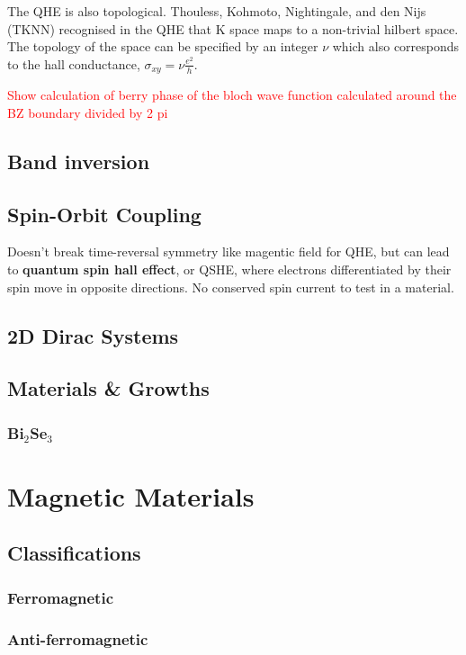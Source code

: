 \documentclass{article} %
\newcommand{\bismuthselinide}[1]{Bi$_2$Se$_3$#1}
\begin{document}
The QHE is also topological. Thouless, Kohmoto, Nightingale, and den Nijs (TKNN) recognised in the QHE that K space maps to a non-trivial hilbert space. The topology of the space can be specified by an integer $\nu$ which also corresponds to the hall conductance, $\sigma_{xy}=\nu \frac{e^2}{h}$. 

\textcolor{red}{Show calculation of berry phase of the bloch wave function calculated around the BZ boundary divided by 2 pi} %




\subsection{Band inversion}
\subsection{Spin-Orbit Coupling}
Doesn't break time-reversal symmetry like magentic field for QHE, but can lead to \textbf{quantum spin hall effect}, or QSHE, where electrons differentiated by their spin move in opposite directions. No conserved spin current to test in a material.

\subsection{2D Dirac Systems}

\subsection{Materials \& Growths}
\subsubsection{\bismuthselinide{}}

\section{Magnetic Materials}
\subsection{Classifications}
\subsubsection{Ferromagnetic}
\subsubsection{Anti-ferromagnetic}
\end{document}
